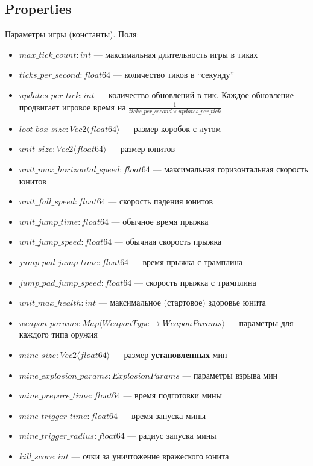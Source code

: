\subsection{Properties}
Параметры игры (константы). Поля:
\begin{itemize}
    \item $max\_tick\_count : int$ --- максимальная длительность игры в тиках
    \item $ticks\_per\_second : float64$ --- количество тиков в ``секунду''
    \item $updates\_per\_tick : int$ --- количество обновлений в тик.
        Каждое обновление продвигает игровое время на $\frac{1}{ticks\_per\_second \times updates\_per\_tick}$
    \item $loot\_box\_size : Vec2 \langle float64 \rangle$ --- размер коробок с лутом
    \item $unit\_size : Vec2 \langle float64 \rangle$ --- размер юнитов
    \item $unit\_max\_horizontal\_speed : float64$ --- максимальная горизонтальная скорость юнитов
    \item $unit\_fall\_speed : float64$ --- скорость падения юнитов
    \item $unit\_jump\_time : float64$ --- обычное время прыжка
    \item $unit\_jump\_speed : float64$ --- обычная скорость прыжка
    \item $jump\_pad\_jump\_time : float64$ --- время прыжка с трамплина
    \item $jump\_pad\_jump\_speed : float64$ --- скорость прыжка с трамплина
    \item $unit\_max\_health : int$ --- максимальное (стартовое) здоровье юнита
    \item $weapon\_params : Map \langle WeaponType \rightarrow WeaponParams \rangle$ --- параметры для каждого типа оружия
    \item $mine\_size : Vec2 \langle float64 \rangle$ --- размер \textbf{установленных} мин
    \item $mine\_explosion\_params : ExplosionParams$ --- параметры взрыва мин
    \item $mine\_prepare\_time : float64$ --- время подготовки мины
    \item $mine\_trigger\_time : float64$ --- время запуска мины
    \item $mine\_trigger\_radius : float64$ --- радиус запуска мины
    \item $kill\_score : int$ --- очки за уничтожение вражеского юнита
\end{itemize}

